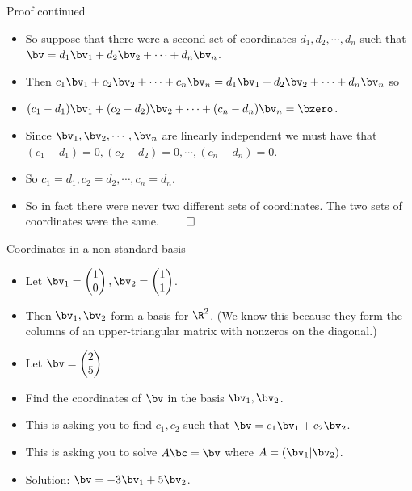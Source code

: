 \documentclass{beamer}
\begin{document}
\begin{frame}{Proof continued}

\begin{itemize}
\item So suppose that there were a second set of coordinates $d_1,d_2,\cdots,d_n$ such that $\bv = d_1 \bv_1 + d_2\bv_2 + \cdots + d_n\bv_n$.
\item Then $c_1 \bv_1 + c_2\bv_2 + \cdots + c_n\bv_n = d_1 \bv_1 + d_2\bv_2 + \cdots + d_n\bv_n$ so
\item $(c_1 -d_1)\bv_1 + (c_2 - d_2)\bv_2 + \cdots + (c_n-d_n)\bv_n = \bzero$.
\item Since $\bv_1,\bv_2,\cdots,\bv_n$ are linearly independent we must have that $(c_1 -d_1)=0, (c_2 -d_2)=0,\cdots,(c_n -d_n)=0$.
\item So $c_1=d_1,c_2=d_2,\cdots,c_n=d_n$.
\item So in fact there were never two different sets of coordinates. The two sets of coordinates were the same. $\qed$
\end{itemize}
\end{frame}

\begin{frame}{Coordinates in a non-standard basis}

\begin{itemize}
\item Let $\bv_1 =
\begin{pmatrix}
1 \\ 0
\end{pmatrix}
,\bv_2=
\begin{pmatrix}
1 \\ 1
\end{pmatrix}
$.
\item Then $\bv_1,\bv_2$ form a basis for $\R^2$. (We know this because they
form the columns of an upper-triangular matrix with nonzeros on the diagonal.)
\item Let $\bv=
\begin{pmatrix}
2 \\ 5
\end{pmatrix}
$
\item Find the coordinates of $\bv$ in the basis $\bv_1,\bv_2$.
\item This is asking you to find $c_1,c_2$ such that $\bv = c_1\bv_1 + c_2\bv_2$.
\item This is asking you to solve $A\bc = \bv$ where $A=\left(\bv_1 \vert \bv_2\right)$.
\item Solution: $\bv = -3\bv_1 + 5\bv_2$.
\end{itemize}
\end{frame}
\end{document}
